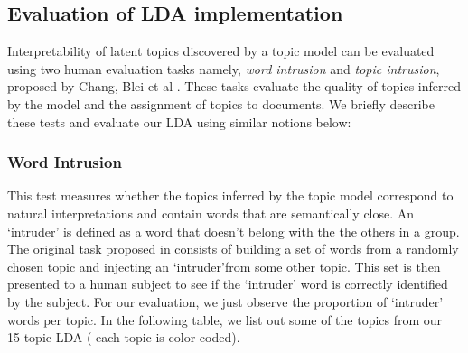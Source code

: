 \documentclass{article} %
\begin{document}
\subsection{Evaluation of LDA implementation}

Interpretability of latent topics discovered by a topic model can be 
evaluated using two human evaluation tasks namely, \textit{word intrusion}
and \textit{topic intrusion}, proposed by Chang, Blei et al \cite{tea-leaves}. 
These tasks evaluate the quality of topics inferred by the model and the 
assignment of topics to documents. We briefly describe these tests and
evaluate our LDA using similar notions below:

\subsubsection{Word Intrusion}
This test measures whether the topics inferred by the topic model correspond
to natural interpretations and contain words that are semantically close. An
`intruder' is defined as a word that doesn't belong with the the others in a 
group. The original task proposed in \cite{tea-leaves} consists of 
building a set of words from a randomly chosen topic and injecting an `intruder'from some other topic. This set is then presented to a human subject to see if 
the `intruder' word is correctly identified by the subject. For our 
evaluation, we just observe the proportion of `intruder' words per topic. 
In the following table, we list out some of the topics from our 15-topic LDA (
each topic is color-coded).
\end{document}

